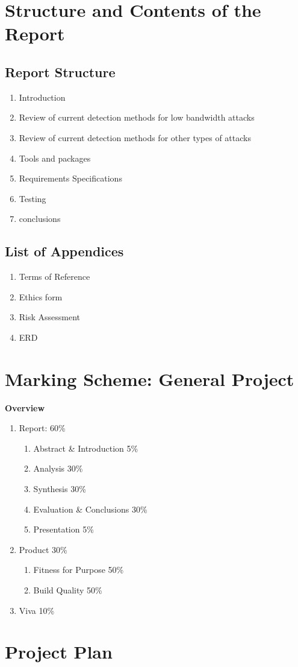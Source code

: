 \section{Structure and Contents of the Report}
\subsection{Report Structure}
\begin{enumerate} [topsep=0pt,itemsep=-0ex,partopsep=1ex,parsep=1pt,leftmargin=7ex,label=CH.\arabic*]
     \item Introduction
     \item Review of current detection methods for low bandwidth attacks
     \item Review of current detection methods for other types of attacks
     \item Tools and packages 
     \item Requirements Specifications
     \item Testing
     \item conclusions
\end{enumerate}

\subsection{List of Appendices}
\begin{enumerate} [label=\Alph*)]
    \item Terms of Reference
    \item Ethics form
    \item Risk Assessment
    \item ERD
\end{enumerate}
\section{Marking Scheme: General Project }
\textbf{Overview}

\begin{enumerate} [topsep=0pt,itemsep=-0ex,partopsep=1ex,parsep=1pt,label=]
    \item Report: 60\%
\begin{enumerate}[topsep=0pt,itemsep=-1ex,partopsep=1ex,parsep=1ex,label=]
\item Abstract \& Introduction 	5\%
\item Analysis 			30\%
\item Synthesis 			30\%
\item  Evaluation \& Conclusions 	30\%
\item Presentation 			5\%
\end{enumerate}
\item Product 30\%
\begin{enumerate}[topsep=0pt,itemsep=-1ex,partopsep=1ex,parsep=1ex,label=]
\item Fitness for Purpose 		50\%
\item Build Quality 			50\%
\end{enumerate}
\item Viva 10\%
\end{enumerate}

\clearpage

\section{Project Plan}
\noindent
{}